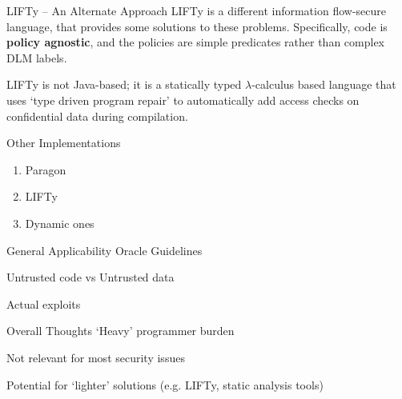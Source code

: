 \begin{frame}{LIFTy -- An Alternate Approach}
	LIFTy is a different information flow-secure language, that provides some solutions to these problems. Specifically, code is \textbf{policy agnostic}, and the policies are simple predicates rather than complex DLM labels.
	
	LIFTy is not Java-based; it is a statically typed $ \lambda $-calculus based language that uses `type driven program repair' to automatically add access checks on confidential data during compilation.
\end{frame}

\begin{frame}{Other Implementations}
	\begin{enumerate}
		\item Paragon
		\item LIFTy
		\item Dynamic ones
	\end{enumerate}
\end{frame}

\begin{frame}{General Applicability}
	Oracle Guidelines
	
	Untrusted code vs Untrusted data
	
	Actual exploits
\end{frame}

\begin{frame}{Overall Thoughts}
	`Heavy' programmer burden
	
	Not relevant for most security issues
	
	Potential for `lighter' solutions (e.g. LIFTy, static analysis tools)
\end{frame}
